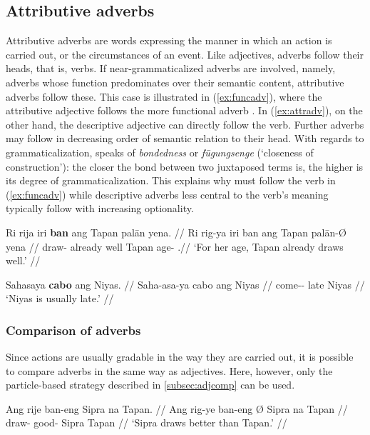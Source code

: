 \subsection{Attributive adverbs}

Attributive adverbs are words expressing the manner in which an action is
carried out, or the circumstances of an event. Like adjectives, adverbs follow
their heads, that is, verbs. If near-grammaticalized adverbs are involved,
namely, adverbs whose function predominates over their semantic content,
attributive adverbs follow these. This case is illustrated in
(\ref{ex:funcadv}), where the attributive adjective 
follows the more functional adverb . In
(\ref{ex:attradv}), on the other hand, the descriptive adjective
 can directly follow the verb. Further adverbs may
follow in decreasing order of semantic relation to their head. With regards to
grammaticalization, \citet[157\psqq]{lehmann2015} speaks of \emph{bondedness}
or \emph{fügungsenge} (`closeness of construction'): the closer the bond
between two juxtaposed terms is, the higher is its degree of
grammaticalization. This explains why  must follow the verb in
(\ref{ex:funcadv}) while descriptive adverbs less central to the verb's meaning
typically follow with increasing optionality.

\pex
\a\label{ex:funcadv}\begingl
	\gla Ri rija iri \textbf{ban} ang Tapan palān yena. //
	\glb Ri rig-ya iri ban ang Tapan palān-Ø yena //
	\glc \InsT{} draw-\TsgM{} already well \Aarg{} Tapan age-\Top{} 
		\TsgF{}.\Gen //
	\glft `For her age, Tapan already draws well.' //
\endgl

\a\label{ex:attradv}\begingl
	\gla Sahasaya \textbf{cabo} ang Niyas. //
	\glb Saha-asa-ya cabo ang Niyas //
	\glc come-\Hab{}-\TsgM{} late \Aarg{} Niyas //
	\glft `Niyas is usually late.' //
\endgl

\xe

\subsubsection{Comparison of adverbs}

Since actions are usually gradable in the way they are carried out, it is 
possible to compare adverbs in the same way as adjectives. Here, however, only 
the particle-based strategy described in \autoref{subsec:adjcomp} 
can be used.

\pex
\a\label{ex:advcomp}\begingl
	\gla Ang rije ban-eng {} Sipra na Tapan. //
	\glb Ang rig-ye ban-eng Ø Sipra na Tapan //
	\glc \AgtT{} draw-\TsgF{} good-\Comp{} \Top{} Sipra \Gen{} Tapan //
	\glft `Sipra draws better than Tapan.' //
\endgl

